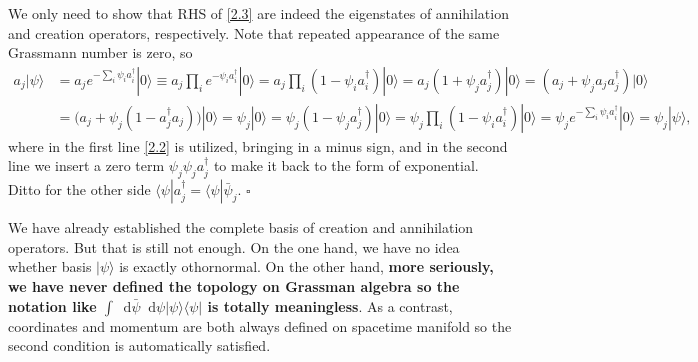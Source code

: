 \documentclass[10pt,nofootinbib]{revtex4}
\newcommand*\dd{\mathop{}\!\mathrm{d}}
\newcounter{Note}[section]
\newenvironment{Proof}{{\par~{\normalfont\bfseries $\vartriangleright$}~~}}{\hfill $\square$\par\hfill\par} %
\begin{document}
	\begin{Proof}
	We only need to show that RHS of \eqref{2.3} are indeed the eigenstates of annihilation and creation operators, respectively. Note that repeated appearance of the same Grassmann number is zero, so
		\begin{align*}
			a_j|\psi\rangle&=a_je^{-\sum_i\psi_ia_i^\dagger}|0\rangle\equiv a_j\prod_i e^{-\psi_ia_i^\dagger}|0\rangle=a_j\prod_i(1-\psi_ia_i^\dagger)|0\rangle=a_j(1+\psi_ja_j^\dagger)|0\rangle=(a_j+\psi_ja_ja_j^\dagger)|0\rangle\\
			&=\bigg(a_j+\psi_j(1-a_j^\dagger a_j)\bigg)|0\rangle=\psi_j|0\rangle=\psi_j(1-\psi_ja_j^\dagger)|0\rangle=\psi_j\prod_i(1-\psi_i a_i^\dagger)|0\rangle=\psi_je^{-\sum_i\psi_ia_i^\dagger}|0\rangle=\psi_j|\psi\rangle,
		\end{align*}
		where in the first line \eqref{2.2} is utilized, bringing in a minus sign, and in the second line we insert a zero term $\psi_j\psi_ja_j^\dagger$ to make it back to the form of exponential. Ditto for the other side $\langle\psi|a_j^\dagger=\langle\psi|\bar\psi_j$.
	\end{Proof}
	We have already established the complete basis of creation and annihilation operators. But that is still not enough. On the one hand, we have no idea whether basis $|\psi\rangle$ is exactly othornormal. On the other hand, \textbf{more seriously, we have never defined the topology on Grassman algebra so the notation like $\displaystyle\int\dd\bar\psi\dd\psi|\psi\rangle\langle\psi|$ is totally meaningless}. As a contrast, coordinates and momentum are both always defined on spacetime manifold so the second condition is automatically satisfied.\par
\end{document}
